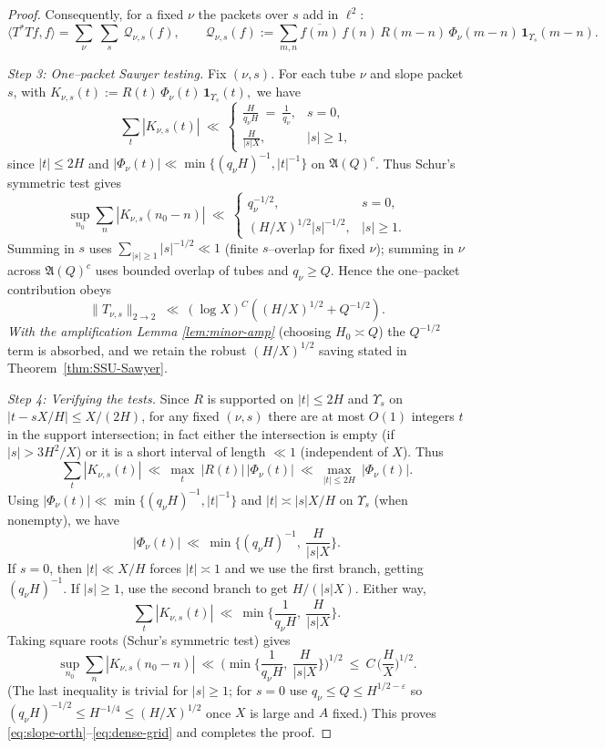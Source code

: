 \begin{proof}
Consequently, for a fixed $\nu$ the packets over $s$ add in $\ell^2$:
\[
\langle T^\ast T f,f\rangle
=\sum_{\nu}\ \sum_{s}\ \mathcal Q_{\nu,s}(f),
\qquad
\mathcal Q_{\nu,s}(f):=\sum_{m,n} \overline{f(m)}\,f(n)\,R(m-n)\,\Phi_\nu(m-n)\,\mathbf 1_{\Upsilon_s}(m-n).
\]

\smallskip
\emph{Step 3: One–packet Sawyer testing.}
Fix $(\nu,s)$. For each tube $\nu$ and slope packet $s$, with
\(
K_{\nu,s}(t):=R(t)\,\Phi_\nu(t)\,\mathbf 1_{\Upsilon_s}(t),
\)
we have
\[
\sum_{t}|K_{\nu,s}(t)|
\ \ll\
\begin{cases}
\displaystyle \frac{H}{q_\nu H}\ =\ \frac{1}{q_\nu}, & s=0,\\[6pt]
\displaystyle \frac{H}{|s|X}, & |s|\ge 1,
\end{cases}
\]
since $|t|\le 2H$ and $|\Phi_\nu(t)|\ll \min\{(q_\nu H)^{-1},|t|^{-1}\}$ on $\mathfrak A(Q)^c$.
Thus Schur’s symmetric test gives
\[
\sup_{n_0}\sum_n |K_{\nu,s}(n_0-n)|
\ \ll\
\begin{cases}
q_\nu^{-1/2}, & s=0,\\
(H/X)^{1/2}|s|^{-1/2}, & |s|\ge 1.
\end{cases}
\tag{$\ast$}
\]
Summing in $s$ uses $\sum_{|s|\ge1} |s|^{-1/2}\ll 1$ (finite $s$–overlap for fixed $\nu$);
summing in $\nu$ across $\mathfrak A(Q)^c$ uses bounded overlap of tubes and $q_\nu\ge Q$.
Hence the one–packet contribution obeys
\[
\|T_{\nu,s}\|_{2\to 2}\ \ll\ (\log X)^C\left( (H/X)^{1/2} + Q^{-1/2}\right).
\]
\emph{With the amplification Lemma \ref{lem:minor-amp}} (choosing $H_0\asymp Q$) the $Q^{-1/2}$ term is absorbed, and we retain the robust $(H/X)^{1/2}$ saving stated in Theorem~\ref{thm:SSU-Sawyer}.

\smallskip
\emph{Step 4: Verifying the tests.}
Since $R$ is supported on $|t|\le 2H$ and $\Upsilon_s$ on $|t-sX/H|\le X/(2H)$, for any fixed $(\nu,s)$ there are at most $O(1)$ integers $t$ in the support intersection; in fact either the intersection is empty (if $|s|>3H^2/X$) or it is a short interval of length $\ll 1$ (independent of $X$). Thus
\[
\sum_{t}|K_{\nu,s}(t)|\ \ll\ \max_{t}\ |R(t)|\,|\Phi_\nu(t)|\ \ll\ \max_{|t|\le 2H}\ |\Phi_\nu(t)|.
\]
Using $|\Phi_\nu(t)|\ll \min\{(q_\nu H)^{-1},|t|^{-1}\}$ and $|t|\asymp |s|X/H$ on $\Upsilon_s$ (when nonempty), we have
\[
|\Phi_\nu(t)|\ \ll\ \min\!\Big\{(q_\nu H)^{-1},\ \frac{H}{|s|X}\Big\}.
\]
If $s=0$, then $|t|\ll X/H$ forces $|t|\asymp 1$ and we use the first branch, getting $(q_\nu H)^{-1}$. If $|s|\ge 1$, use the second branch to get $H/(|s|X)$. Either way,
\[
\sum_{t}|K_{\nu,s}(t)|\ \ll\ \min\!\Big\{\frac{1}{q_\nu H},\ \frac{H}{|s|X}\Big\}.
\]
Taking square roots (Schur’s symmetric test) gives
\[
\sup_{n_0}\sum_n |K_{\nu,s}(n_0-n)|\ \ll\ \Big(\min\!\Big\{\frac{1}{q_\nu H},\ \frac{H}{|s|X}\Big\}\Big)^{1/2}
\ \le\ C\,\Big(\frac{H}{X}\Big)^{1/2}.
\]
(The last inequality is trivial for $|s|\ge 1$; for $s=0$ use $q_\nu\le Q\le H^{1/2-\varepsilon}$ so $(q_\nu H)^{-1/2}\le H^{-1/4}\le (H/X)^{1/2}$ once $X$ is large and $A$ fixed.) This proves \eqref{eq:slope-orth}–\eqref{eq:dense-grid} and completes the proof.
\end{proof}

